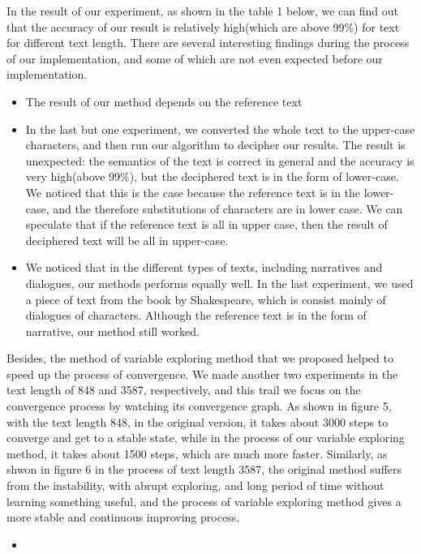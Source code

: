 \documentclass{acmtog} %
\begin{document}
In the result of our experiment, as shown in the table 1 below, we can find out that the accuracy of our result is relatively high(which are above 99\%) for text for different text length. There are several interesting findings during the process of our implementation, and some of which are not even expected before our implementation.\\
\begin{itemize}
    \item The result of our method depends on the reference text
    \item In the last but one experiment, we converted the whole text to the upper-case characters, and then run our algorithm to decipher our results. The result is unexpected: the semantics of the text is correct in general and the accuracy is very high(above 99\%), but the deciphered text is in the form of lower-case. We noticed that this is the case because the reference text is in the lower-case, and the therefore substitutions of characters are in lower case. We can speculate that if the reference text is all in upper case, then the result of deciphered text will be all in upper-case.
    \item We noticed that in the different types of texts, including narratives and dialogues, our methods performs equally well. In the last experiment, we used a piece of text from the book by Shakespeare, which is consist mainly of dialogues of characters. Although the reference text is in the form of narrative, our method still worked.\\
\end{itemize}
Besides, the method of variable exploring method that we proposed helped to speed up the process of convergence. We made another two experiments in the text length of 848 and 3587, respectively, and this trail we focus on the convergence process by watching its convergence graph. As shown in figure 5, with the text length 848, in the original version, it takes about 3000 steps to converge and get to a stable state, while in the process of our variable exploring method, it takes about 1500 steps, which are much more faster. Similarly, as shwon in figure 6 in the process of text length 3587, the original method suffers from the instability, with abrupt exploring, and long period of time without learning something useful, and the process of variable exploring method gives a more stable and continuous improving process.\\
\begin{itemize}
    \item 
\end{itemize}
\end{document}
